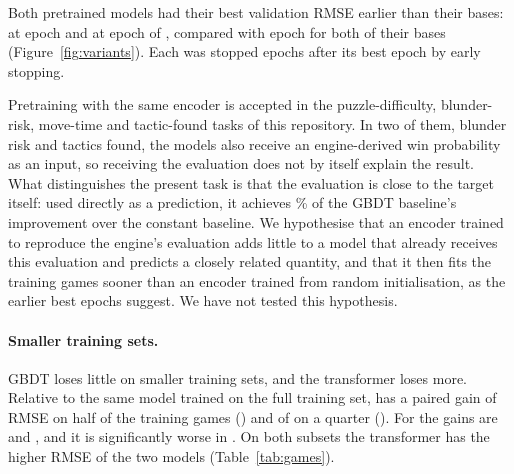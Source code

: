 \documentclass[11pt]{article}
\begin{document}
Both pretrained models had their best validation RMSE earlier than their
bases:  at epoch
 and
 at epoch
 of
, compared with epoch
 for both of their bases
(Figure~\ref{fig:variants}). Each was stopped  epochs
after its best epoch by early stopping.

Pretraining with the same encoder is accepted in the puzzle-difficulty,
blunder-risk, move-time and tactic-found tasks of this repository. In two of
them, blunder risk and tactics found, the models also receive an
engine-derived win probability as an input, so receiving the evaluation does
not by itself explain the result. What distinguishes the present task is that
the evaluation is close to the target itself: used directly as a prediction,
it achieves \% of the GBDT baseline's
improvement over the constant baseline. We hypothesise that an encoder
trained to reproduce the engine's evaluation adds little to a model that
already receives this evaluation and predicts a closely related quantity, and
that it then fits the training games sooner than an encoder trained from
random initialisation, as the earlier best epochs suggest. We have not tested
this hypothesis.
\fi



\ifgames
\paragraph{Smaller training sets.}
GBDT loses little on smaller training sets, and the transformer loses more.
Relative to the same model trained on the full training set, 
has a paired gain of  RMSE on half of the
training games () and of
 on a quarter
(). For
 the gains are
 and
, and it
is significantly worse in .
On both subsets the transformer has the higher RMSE of the two models
(Table~\ref{tab:games}).
\fi
\end{document}
